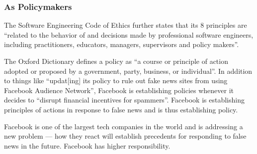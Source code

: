 \subsubsection{As Policymakers}

\par The Software Engineering Code of Ethics further states that its 8 principles are ``related to the behavior of and decisions made by professional software engineers, including practitioners, educators, managers, supervisors and policy makers''. \cite{se_code}
 
\par The Oxford Dictionary defines a policy as ``a course or principle of action adopted or proposed by a government, party, business, or individual''. \cite{oxford} In addition to things like ``updat[ing] its policy to rule out fake news sites from using Facebook Audience Network'', \cite{tc_ban} Facebook is establishing policies whenever it decides to ``disrupt financial incentives for spammers''. \cite{fb_hoaxes_2016} Facebook is establishing principles of actions in response to false news and is thus establishing policy.

\par Facebook is one of the largest tech companies in the world and is addressing a new problem --- how they react will establish precedents for responding to false news in the future. Facebook has higher responsibility.